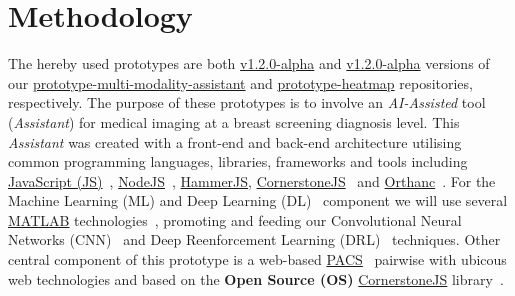 
\section{Methodology}
\label{sec:sec003}

The hereby used prototypes are both \hyperlink{https://github.com/mida-project/prototype-multi-modality-assistant/releases/tag/v1.2.0-alpha}{v1.2.0-alpha} and \hyperlink{https://github.com/mida-project/prototype-heatmap/releases/tag/v1.2.0-alpha}{v1.2.0-alpha} versions of our \hyperlink{https://github.com/mida-project/prototype-multi-modality-assistant/}{prototype-multi-modality-assistant} and \hyperlink{https://github.com/mida-project/prototype-heatmap}{prototype-heatmap} repositories, respectively. The purpose of these prototypes is to involve an \textit{AI-Assisted} tool (\textit{Assistant}) for medical imaging at a breast screening diagnosis level. This \textit{Assistant} was created with a front-end and back-end architecture utilising common programming languages, libraries, frameworks and tools including \hyperlink{https://www.javascript.com/}{JavaScript (JS)}~\cite{flanagan2006javascript}, \hyperlink{https://nodejs.org/}{NodeJS}~\cite{wilson2018node}, \hyperlink{https://hammerjs.github.io/}{HammerJS}, \hyperlink{https://cornerstonejs.org/}{CornerstoneJS}~\cite{hostetter2018integration} and \hyperlink{https://www.orthanc-server.com/}{Orthanc}~\cite{Jodogne:ISBI2013}. For the Machine Learning (ML) and Deep Learning (DL)~\cite{ribeiro2017real, ribeiro2016real} component we will use several \hyperlink{https://www.mathworks.com/products/matlab.html}{MATLAB} technologies~\cite{vedaldi2015matconvnet}, promoting and feeding our Convolutional Neural Networks (CNN)~\cite{carneiro2015unregistered} and Deep Reenforcement Learning (DRL)~\cite{maicas2017deep} techniques. Other central component of this prototype is a web-based \hyperlink{https://www.sciencedirect.com/topics/medicine-and-dentistry/picture-archiving-and-communication-system}{PACS}~\cite{cooke2003picture} pairwise with ubicous web technologies and based on the \textbf{Open Source (OS)} \hyperlink{https://cornerstonejs.org/}{CornerstoneJS} library~\cite{feller2002understanding, hostetter2018integration}.


